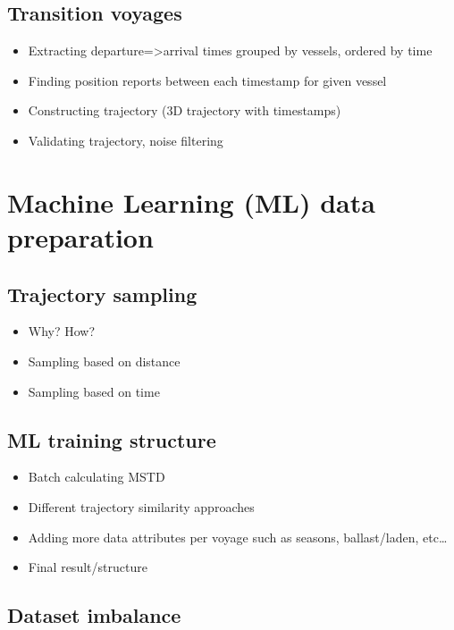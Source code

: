 \subsection{Transition voyages}

\begin{itemize}
    \item Extracting departure=>arrival times grouped by vessels, ordered by time
    \item Finding position reports between each timestamp for given vessel
    \item Constructing trajectory (3D trajectory with timestamps)
    \item Validating trajectory, noise filtering
\end{itemize}

\section{Machine Learning (ML) data preparation}

\subsection{Trajectory sampling}

\begin{itemize}
    \item Why? How?
    \item Sampling based on distance
    \item Sampling based on time
\end{itemize}

\subsection{ML training structure}

\begin{itemize}
    \item Batch calculating MSTD
    \item Different trajectory similarity approaches
    \item Adding more data attributes per voyage such as seasons, ballast/laden, etc\ldots
    \item Final result/structure
\end{itemize}

\subsection{Dataset imbalance}

